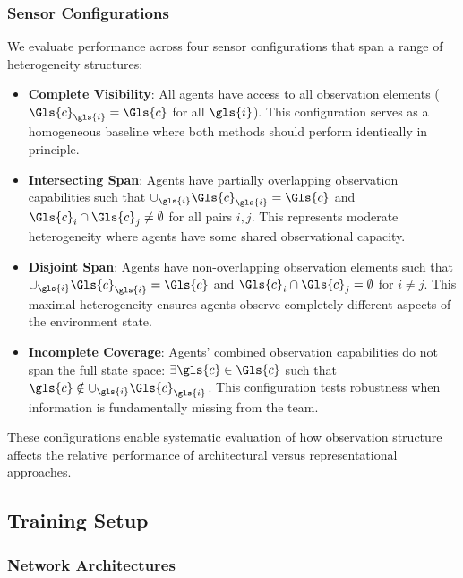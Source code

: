 \documentclass[conference]{IEEEtran}
\begin{document}
\subsubsection{Sensor Configurations}

We evaluate performance across four sensor configurations that 
span a range of heterogeneity structures:

\begin{itemize}
    \item \textbf{Complete Visibility}: 
        All agents have access to all observation elements 
        (\(\Gls{c}_{\gls{i}} = \Gls{c}\) for all \(\gls{i}\)). 
        This configuration serves as a homogeneous baseline 
        where both methods should perform identically in principle.
        \item \textbf{Intersecting Span}: 
        Agents have partially overlapping observation capabilities such that 
        \(\cup_{\gls{i}} \Gls{c}_{\gls{i}} = \Gls{c}\) and 
        \(\Gls{c}_i \cap \Gls{c}_j \neq \emptyset\) for all pairs \(i,j\). 
        This represents moderate heterogeneity where agents have some 
        shared observational capacity.
        \item \textbf{Disjoint Span}: 
        Agents have non-overlapping observation elements such that 
        \(\cup_{\gls{i}} \Gls{c}_{\gls{i}} = \Gls{c}\) and
        \(\Gls{c}_i \cap \Gls{c}_j = \emptyset\) for \(i \neq j\).
        This maximal heterogeneity ensures agents observe completely different 
        aspects of the environment state.
        \item \textbf{Incomplete Coverage}: 
        Agents' combined observation capabilities do not span the full state space: 
        \(\exists \gls{c}\in\Gls{c}\) such that 
        \(\gls{c} \notin \cup_{\gls{i}} \Gls{c}_{\gls{i}}\). 
        This configuration tests robustness when information is 
        fundamentally missing from the team.
\end{itemize}

These configurations enable systematic evaluation of how observation structure 
affects the relative performance of architectural versus representational approaches.

\subsection{Training Setup}

\subsubsection{Network Architectures}
\end{document}
